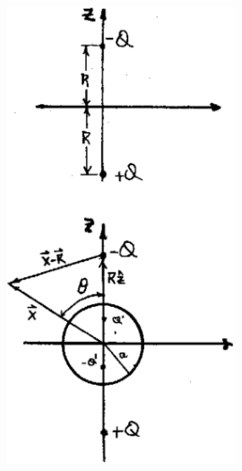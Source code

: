 \documentclass[10pt,oneside]{CBFT_book}
\begin{document}
\begin{figure}[htb]
	\begin{center}
	\includegraphics[width=0.6\textwidth]{images/fig_ft1_perturbacion1.pdf}	 
	\end{center}
	\caption{}
\end{figure} 

\end{document}
